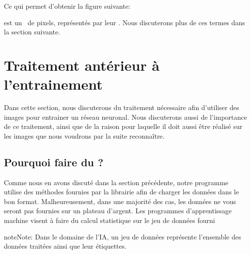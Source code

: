 \documentclass[letterpaper,10pt,french]{sphinxmanual}
\begin{document}
Ce qui permet d’obtenir la figure suivante:


 est un  de pixels, représentés par leur . Nous discuterons plus de ces termes dans la section suivante.


\section{Traitement antérieur à l’entrainement}
\label{\detokenize{preprocessing:traitement-anterieur-a-lentrainement}}\label{\detokenize{preprocessing::doc}}
Dans cette section, nous discuterons du traitement nécessaire afin d’utiliser des images pour entrainer un réseau neuronal. Nous discuterons aussi de l’importance de ce traitement, ainsi que de la raison pour laquelle il doit aussi être réalisé sur les images que nous voudrons par la suite reconnaître.


\subsection{Pourquoi faire du ?}
\label{\detokenize{preprocessing:pourquoi-faire-du-preprocessing}}
Comme nous en avons discuté dans la section précédente, notre programme utilise des méthodes fournies par la librairie  afin de charger les données dans le bon format. Malheureusement, dans une majorité des cas, les données ne vous seront pas fournies sur un plateau d’argent. Les programmes d’apprentissage machine visent à faire du calcul statistique sur le jeu de données fourni

\begin{sphinxadmonition}{note}{Note:}
Dans le domaine de l’IA, un jeu de données représente l’ensemble des données traitées ainsi que leur étiquettes.
\end{sphinxadmonition}
\end{document}
